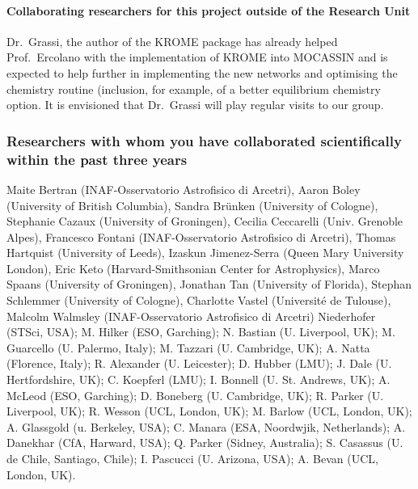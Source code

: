 \documentclass[10pt,fleqn,twoside]{article}
\begin{document}
\paragraph{Collaborating researchers for this project outside of
  the Research Unit}

Dr.\ Grassi, the author of the KROME package has already helped Prof.\ Ercolano with the implementation of KROME into MOCASSIN and is expected to help further in implementing the new networks and optimising the chemistry routine (inclusion, for example, of a better equilibrium chemistry option. 
It is envisioned that Dr.\ Grassi will play regular visits to our group.    

\subsubsection{Researchers with whom you have collaborated scientifically within the past three years}

Maite Bertran (INAF-Osservatorio Astrofisico di Arcetri), Aaron Boley (University of British Columbia), Sandra Brünken (University of Cologne), Stephanie Cazaux (University of Groningen), Cecilia Ceccarelli (Univ. Grenoble Alpes), Francesco Fontani (INAF-Osservatorio Astrofisico di Arcetri), Thomas Hartquist (University of Leeds), Izaskun Jimenez-Serra (Queen Mary University London), Eric Keto (Harvard-Smithsonian Center for Astrophysics), Marco Spaans (University of Groningen), Jonathan Tan (University of Florida), Stephan Schlemmer (University of Cologne), Charlotte Vastel (Université de Tulouse), Malcolm Walmsley (INAF-Osservatorio Astrofisico di Arcetri)
 Niederhofer (STSci, USA); M. Hilker (ESO, Garching); N. Bastian (U. Liverpool,
UK); M. Guarcello (U. Palermo, Italy); M. Tazzari (U. Cambridge, UK);
A. Natta (Florence, Italy); R. Alexander (U. Leicester); D. Hubber
(LMU); J. Dale (U. Hertfordshire, UK); C. Koepferl (LMU); I. Bonnell
(U. St. Andrews, UK); A. McLeod (ESO, Garching); D. Boneberg
(U. Cambridge, UK); R. Parker (U. Liverpool, UK); R. Wesson (UCL,
London, UK); M. Barlow (UCL, London, UK); A. Glassgold (u. Berkeley,
USA); C. Manara (ESA, Noordwjik, Netherlands); A. Danekhar (CfA,
Harward, USA); Q. Parker (Sidney, Australia); S. Casassus
(U. de Chile, Santiago, Chile); I. Pascucci (U. Arizona, USA);
A. Bevan (UCL, London, UK).
\end{document}
